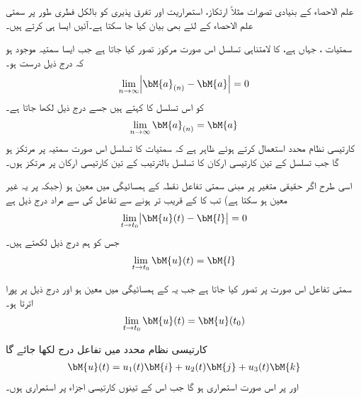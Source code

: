علم الاحصاء کے بنیادی تصورات  مثلاً ارتکاز، استمراریت اور تفرق پذیری کو  بالکل فطری طور پر سمتی علم الاحصاء کے لئے بھی  بیان کیا جا سکتا ہے۔آئیں ایسا ہی کرتے ہیں۔

سمتیات ، جہاں  ہے، کا لامتناہی تسلسل اس صورت مرکوز تصور کیا جاتا ہے جب ایسا سمتیہ  موجود ہو کہ درج ذیل درست ہو۔
\begin{align}
\lim_{n\to \infty} \abs{\bM{a}_{(n)}-\bM{a}}=0
\end{align}  
 کو اس تسلسل کا  کہتے ہیں جسے درج ذیل لکھا جاتا ہے۔
\begin{align}
\lim_{n\to \infty} \bM{a}_{(n)}=\bM{a}
\end{align}
کارتیسی نظام محدد استعمال کرتے ہوئے ظاہر ہے کہ سمتیات کا تسلسل اس صورت سمتیہ  پر مرتکز ہو گا جب تسلسل کے تین کارتیسی ارکان کا تسلسل بالترتیب  کے تین کارتیسی ارکان پر مرتکز ہوں۔

اسی طرح اگر حقیقی متغیر  پر مبنی سمتی تفاعل  نقطہ  کے ہمسائیگی میں معین ہو (جبکہ  پر یہ غیر معین ہو سکتا ہے) تب    کا  کے قریب تر ہونے سے تفاعل کی    سے مراد درج ذیل ہے
\begin{align}
\lim_{t\to t_0} \abs{\bM{u}(t)-\bM{l}}=0
\end{align}  
جس کو ہم درج ذیل لکھتے ہیں۔
\begin{align}
\lim_{t\to t_0} \bM{u}(t)=\bM{l}
\end{align}

سمتی تفاعل  اس صورت  پر  تصور کیا جاتا ہے جب یہ  کے ہمسائیگی میں معین ہو اور درج ذیل پر پورا اترتا ہو۔
\begin{align}
\lim_{t\to t_0} \bM{u}(t)=\bM{u}(t_0)
\end{align}

کارتیسی نظام محدد میں تفاعل  درج لکھا جائے گا
\begin{align}
\bM{u}(t)=u_1(t)\bM{i}+u_2(t)\bM{j}+u_3(t)\bM{k}
\end{align}
اور  پر  اس صورت استمراری ہو گا جب اس کے تینوں کارتیسی اجزاء  پر استمراری ہوں۔

